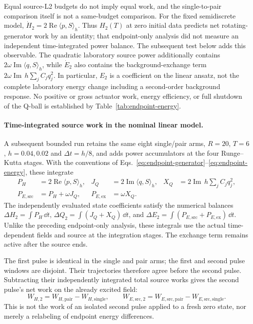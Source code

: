 Equal source-L2 budgets do not imply equal work, and the single-to-pair
comparison itself is not a same-budget comparison. For the fixed
semidiscrete model, $\dot H_2=2\operatorname{Re}\langle p,S\rangle_h$.
Thus $H_2(T)$ at zero initial data predicts net rotating-generator work
by an identity; that endpoint-only analysis did not measure an independent
time-integrated power balance. The subsequent test below adds this observable.
The quadratic laboratory source power additionally contains
$2\omega\operatorname{Im}\langle q,S\rangle_h$, while $\dot E_2$
also contains the background-exchange term
$2\omega\operatorname{Im}\,h\sum_j C_jq_j^2$.
In particular, $E_2$ is a coefficient on the linear ansatz, not the complete
laboratory energy change including a second-order background response.
No positive or gross actuator work, energy efficiency, or full shutdown
of the Q-ball is established by Table~\ref{tab:endpoint-energy}.
\paragraph{Time-integrated source work in the nominal linear model.}
A subsequent bounded run retains the same eight single/pair arms,
$R=20$, $T=6$, $h=0.04,0.02$ and $\Delta t=h/8$, and adds power
accumulators at the four Runge--Kutta stages. With the conventions of
Eqs.~\eqref{eq:endpoint-generator}--\eqref{eq:endpoint-energy}, these
integrate
\begin{align}
 P_H&=2\operatorname{Re}\langle p,S\rangle_h,&
 J_Q&=2\operatorname{Im}\langle q,S\rangle_h,&
 X_Q&=2\operatorname{Im}\,h\sum_jC_jq_j^2,\\
 P_{E,\mathrm{src}}&=P_H+\omega J_Q,&
 P_{E,\mathrm{ex}}&=\omega X_Q.
\end{align}
The independently evaluated state coefficients satisfy the numerical
balances $\Delta H_2=\int P_H\,\dd t$,
$\Delta Q_2=\int(J_Q+X_Q)\,\dd t$, and
$\Delta E_2=\int(P_{E,\mathrm{src}}+P_{E,\mathrm{ex}})\,\dd t$.
Unlike the preceding endpoint-only analysis, these integrals use the
actual time-dependent fields and source at the integration stages.
The exchange term remains active after the source ends.

The first pulse is identical in the single and pair arms; the first and
second pulse windows are disjoint. Their trajectories therefore agree before
the second pulse. Subtracting their independently integrated total source
works gives the second pulse's net work on the already excited field:
\begin{equation}
 W_{H,2}=W_{H,\mathrm{pair}}-W_{H,\mathrm{single}},\qquad
 W_{E,\mathrm{src},2}=W_{E,\mathrm{src},\mathrm{pair}}
                       -W_{E,\mathrm{src},\mathrm{single}}.
\end{equation}
This is not the work of an isolated second pulse applied to a fresh
zero state, nor merely a relabeling of endpoint energy differences.

